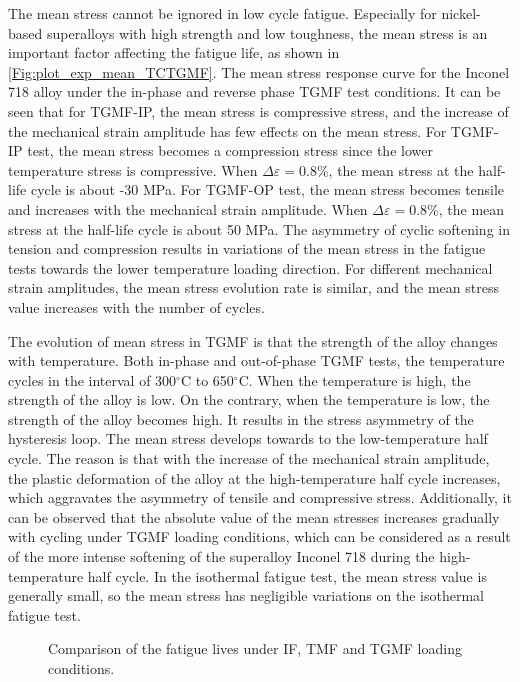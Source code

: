 \documentclass[preprint,5p,twocolumn,10pt,sort&compress]{elsarticle}
\begin{document}
The mean stress cannot be ignored in low cycle fatigue. Especially for nickel-based superalloys with high strength and low toughness, the mean stress is an important factor affecting the fatigue life, as shown in \autoref{Fig:plot_exp_mean_TCTGMF}. The mean stress response curve for the Inconel 718 alloy under the in-phase and reverse phase TGMF test conditions. It can be seen that for TGMF-IP, the mean stress is compressive stress, and the increase of the mechanical strain amplitude has few effects on the mean stress. For TGMF-IP test, the mean stress becomes a compression stress since the lower temperature stress is compressive. When $\Delta \varepsilon=0.8\%$, the mean stress at the half-life cycle is about -30 MPa.  For TGMF-OP test, the mean stress becomes tensile and increases with the mechanical strain amplitude.
When $\Delta \varepsilon=0.8\%$, the mean stress at the half-life cycle is about 50 MPa. The asymmetry of cyclic softening in tension and compression results in variations of the mean stress in the fatigue tests towards the lower temperature loading direction. For different mechanical strain amplitudes, the mean stress evolution rate is similar, and the mean stress value increases with the number of cycles.

The evolution of mean stress in TGMF is that the strength of the alloy changes with temperature. Both in-phase and out-of-phase TGMF tests, the temperature cycles in the interval of 300$^\circ$C to 650$^\circ$C. When the temperature is high, the strength of the alloy is low. On the contrary, when the temperature is low, the strength of the alloy becomes high. It results in the stress asymmetry of the hysteresis loop. The mean stress develops towards to the low-temperature half cycle.
The reason is that with the increase of the mechanical strain amplitude, the plastic deformation of the alloy at the high-temperature half cycle increases, which aggravates the asymmetry of tensile and compressive stress.
Additionally, it can be observed that the absolute value of the mean stresses increases gradually with cycling under TGMF loading conditions, which can be considered as a result of the more intense softening of the superalloy Inconel 718 during the high-temperature half cycle. In the isothermal fatigue test, the mean stress value is generally small, so the mean stress has  negligible variations on the isothermal fatigue test.

\begin{figure}[!ht]
\caption{Comparison of the fatigue lives under IF, TMF and TGMF loading conditions.}
\label{Fig:plot_exp_fatigue_life_TGMF}
\end{figure}
\end{document}
